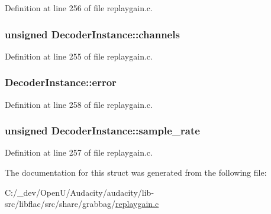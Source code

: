 Definition at line 256 of file replaygain.\+c.

\subsubsection[{\texorpdfstring{channels}{channels}}]{\setlength{\rightskip}{0pt plus 5cm}unsigned Decoder\+Instance\+::channels}\hypertarget{struct_decoder_instance_aa4849aea2f110db8c663d7f38137dcc4}{}\label{struct_decoder_instance_aa4849aea2f110db8c663d7f38137dcc4}


Definition at line 255 of file replaygain.\+c.

\subsubsection[{\texorpdfstring{error}{error}}]{ Decoder\+Instance\+::error}\hypertarget{struct_decoder_instance_a6c9aa0b901f26c34c8971560d3a6a04b}{}\label{struct_decoder_instance_a6c9aa0b901f26c34c8971560d3a6a04b}


Definition at line 258 of file replaygain.\+c.

\subsubsection[{\texorpdfstring{sample\+\_\+rate}{sample_rate}}]{\setlength{\rightskip}{0pt plus 5cm}unsigned Decoder\+Instance\+::sample\+\_\+rate}\hypertarget{struct_decoder_instance_a3cc8c086234e3e851cee49a767f82054}{}\label{struct_decoder_instance_a3cc8c086234e3e851cee49a767f82054}


Definition at line 257 of file replaygain.\+c.



The documentation for this struct was generated from the following file\+:\begin{DoxyCompactItemize}
\item 
C\+:/\+\_\+dev/\+Open\+U/\+Audacity/audacity/lib-\/src/libflac/src/share/grabbag/\hyperlink{share_2grabbag_2replaygain_8c}{replaygain.\+c}\end{DoxyCompactItemize}
